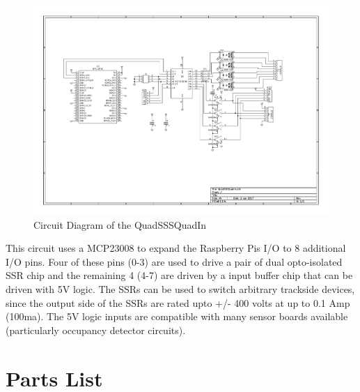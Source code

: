 \begin{figure}[hbpt]\begin{centering}%
\includegraphics[width=5in]{QuadSSSQuadIn.pdf}
\caption{Circuit Diagram of the QuadSSSQuadIn}
\end{centering}\end{figure}
This circuit uses a MCP23008 to expand the Raspberry Pis I/O to 8 additional 
I/O pins.  Four of these pins (0-3) are used to drive a pair of dual 
opto-isolated SSR chip and the remaining 4 (4-7) are driven by a input buffer 
chip that can be driven with 5V logic.  The SSRs can be used to switch 
arbitrary trackside devices, since the output side of the SSRs are rated upto 
+/- 400 volts at up to 0.1 Amp (100ma).  The 5V logic inputs are compatible 
with many sensor boards available (particularly occupancy detector circuits).

\section{Parts List}

